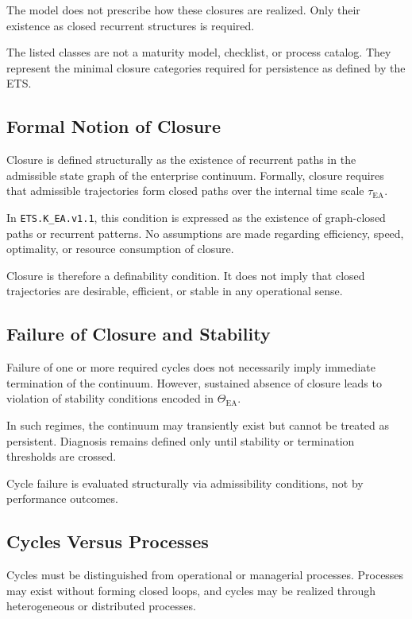 The model does not prescribe how these closures are realized.
Only their existence as closed recurrent structures is required.

The listed classes are not a maturity model, checklist, or process
catalog.
They represent the minimal closure categories required for persistence
as defined by the ETS.

\subsection{Formal Notion of Closure}

Closure is defined structurally as the existence of recurrent paths in
the admissible state graph of the enterprise continuum.
Formally, closure requires that admissible trajectories form closed
paths over the internal time scale $\tau_{\mathrm{EA}}$.

In \texttt{ETS.K\_EA.v1.1}, this condition is expressed as the existence
of graph-closed paths or recurrent patterns.
No assumptions are made regarding efficiency, speed, optimality, or
resource consumption of closure.

Closure is therefore a definability condition.
It does not imply that closed trajectories are desirable, efficient, or
stable in any operational sense.

\subsection{Failure of Closure and Stability}

Failure of one or more required cycles does not necessarily imply
immediate termination of the continuum.
However, sustained absence of closure leads to violation of stability
conditions encoded in $\Theta_{\mathrm{EA}}$.

In such regimes, the continuum may transiently exist but cannot be
treated as persistent.
Diagnosis remains defined only until stability or termination thresholds
are crossed.

Cycle failure is evaluated structurally via admissibility conditions,
not by performance outcomes.

\subsection{Cycles Versus Processes}

Cycles must be distinguished from operational or managerial processes.
Processes may exist without forming closed loops, and cycles may be
realized through heterogeneous or distributed processes.

